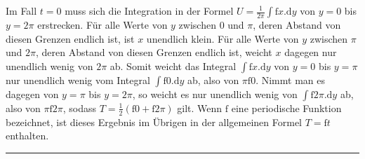 \par
Im Fall \(t=0\) muss sich die Integration in der Formel \(U=\frac{1}{2\pi}\int\mathrm{f}x.\mathrm{d}y\) von \(y=0\) bis \(y=2\pi\) erstrecken. Für alle Werte von \(y\) zwischen \(0\) und \(\pi\), deren Abstand von diesen Grenzen endlich ist, ist \(x\) unendlich klein. Für alle Werte von \(y\) zwischen \(\pi\) und \(2\pi\), deren Abstand von diesen Grenzen endlich ist, weicht \(x\) dagegen nur unendlich wenig von \(2\pi\) ab. Somit weicht das Integral \(\int\mathrm{f}x.\mathrm{d}y\) von \(y=0\) bis \(y=\pi\) nur unendlich wenig vom Integral \(\int\mathrm{f}0.\mathrm{d}y\) ab, also von \(\pi\mathrm{f}0\). Nimmt man es dagegen von \(y=\pi\) bis \(y=2\pi\), so weicht es nur unendlich wenig von \(\int\mathrm{f}2\pi.\mathrm{d}y\) ab, also von \(\pi\mathrm{f}2\pi\), sodass \(T=\frac12(\mathrm{f}0+\mathrm{f}2\pi)\) gilt. Wenn \(\mathrm{f}\) eine periodische Funktion bezeichnet, ist dieses Ergebnis im Übrigen in der allgemeinen Formel \(T=\mathrm{f}t\) enthalten.
\par\medskip\begin{center}\rule{.24\linewidth}{.3pt}\end{center}
\endgroup
